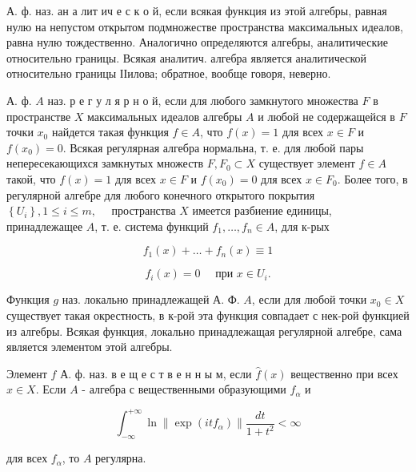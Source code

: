 \documentclass[10pt]{article}
\begin{document}
А. ф. наз. ан а лит ич е с к о й, если всякая функция из этой алгебры, равная нулю на непустом открытом подмножестве пространства максимальных идеалов, равна нулю тождественно. Аналогично определяются алгебры, аналитические относительно границы. Всякая аналитич. алгебра является аналитической относительно границы ІІилова; обратное, вообще говоря, неверно.



А. ф. $A$ наз. р е г у л я р н о й, если для любого замкнутого множества $F$ в пространстве $X$ максимальных идеалов алгебры $A$ и любой не содержащейся в $F$ точки $x_{0}$ найдется такая функция $f \in A$, что $f(x)=1$ для всех $x \in F$ и $f\left(x_{0}\right)=0$. Всякая регулярная алгебра нормальна, т. е. для любой пары непересекающихся замкнутых множеств $F, F_{0} \subset X$ существует элемент $f \in A$ такой, что $f(x)=1$ для всех $x \in F$ и $f\left(x_{0}\right)=0$ для всех $x \in F_{0}$. Более того, в регулярной алгебре для любого конечного открытого покрытия $\left\{U_{i}\right\}, 1 \leqslant i \leqslant m, \quad$ пространства $X$ имеется разбиение единицы, принадлежащее $A$, т. е. система функций $f_{1}, \ldots, f_{n} \in A$, для к-рых



\[

f_{1}(x)+\ldots+f_{n}(x) \equiv 1

\]



\[

f_{i}(x)=0 \quad \text { при } x \in U_{i} .

\]



Функция $g$ наз. локально принадлежащей А. Ф. $A$, если для любой точки $x_{0} \in X$ существует такая окрестность, в к-рой эта функция совпадает с нек-рой функцией из алгебры. Всякая функция, локально принадлежащая регулярной алгебре, сама является элементом этой алгебры.



Элемент $f$ А. ф. наз. в е щ е с т в е н н ы м, если $\hat{f}(x)$ вещественно при всех $x \in X$. Если $A$ - алгебра с вещественными образующими $f_{\alpha}$ и



\[

\int_{-\infty}^{+\infty} \ln \left\|\exp \left(i t f_{\alpha}\right)\right\| \frac{d t}{1+t^{2}}<\infty

\]



для всех $f_{\alpha}$, то $A$ регулярна.
\end{document}
